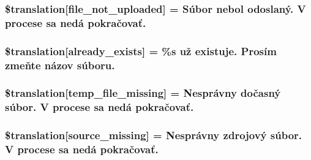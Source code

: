 \subsubsection[{\$translation}]{\setlength{\rightskip}{0pt plus 5cm}\$translation\mbox{[}\textquotesingle{}file\+\_\+not\+\_\+uploaded\textquotesingle{}\mbox{]} = \textquotesingle{}Súbor nebol odoslaný. V procese sa nedá pokračovať.\textquotesingle{}}\label{class_8upload_8sk___s_k_8php_a4ce76e7be0b3a03c2b47f6d70c21832e}
\hypertarget{class_8upload_8sk___s_k_8php_afd84e910217f04139f567c41e292afa5}{}
\subsubsection[{\$translation}]{\setlength{\rightskip}{0pt plus 5cm}\$translation\mbox{[}\textquotesingle{}already\+\_\+exists\textquotesingle{}\mbox{]} = \textquotesingle{}\%s už existuje. Prosím zmeňte názov súboru.\textquotesingle{}}\label{class_8upload_8sk___s_k_8php_afd84e910217f04139f567c41e292afa5}
\hypertarget{class_8upload_8sk___s_k_8php_ab0fa87a88aba2624004581eed0633325}{}
\subsubsection[{\$translation}]{\setlength{\rightskip}{0pt plus 5cm}\$translation\mbox{[}\textquotesingle{}temp\+\_\+file\+\_\+missing\textquotesingle{}\mbox{]} = \textquotesingle{}Nesprávny dočasný súbor. V procese sa nedá pokračovať.\textquotesingle{}}\label{class_8upload_8sk___s_k_8php_ab0fa87a88aba2624004581eed0633325}
\hypertarget{class_8upload_8sk___s_k_8php_aceaaf7355acaaf10f0ae60378d03c468}{}
\subsubsection[{\$translation}]{\setlength{\rightskip}{0pt plus 5cm}\$translation\mbox{[}\textquotesingle{}source\+\_\+missing\textquotesingle{}\mbox{]} = \textquotesingle{}Nesprávny zdrojový súbor. V procese sa nedá pokračovať.\textquotesingle{}}\label{class_8upload_8sk___s_k_8php_aceaaf7355acaaf10f0ae60378d03c468}
\hypertarget{class_8upload_8sk___s_k_8php_aff2427c72a2598aefa6d58df1dd18b08}{}
